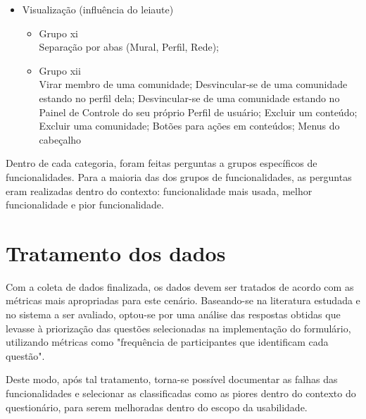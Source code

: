 \begin{itemize}
\item Visualização (influência do leiaute) \\
    \begin{itemize}
    \item Grupo xi\\
    Separação por abas (Mural, Perfil, Rede); 
    \item Grupo xii\\
    Virar membro de uma comunidade; Desvincular-se de uma comunidade estando no perfil dela; Desvincular-se de uma comunidade estando no Painel de Controle do seu próprio Perfil de usuário; Excluir um conteúdo; Excluir uma comunidade; Botões para ações em conteúdos; Menus do cabeçalho
    \end{itemize}

\end{itemize}

	Dentro de cada categoria, foram feitas perguntas a grupos específicos de funcionalidades. Para a maioria das dos grupos de funcionalidades, as perguntas eram realizadas dentro do contexto: funcionalidade mais usada, melhor funcionalidade e pior funcionalidade.



\section{Tratamento dos dados}
\label{sec:trat-dados}
    
    Com a coleta de dados finalizada, os dados devem ser tratados de acordo com as métricas mais apropriadas para este cenário. Baseando-se na literatura estudada e no sistema a ser avaliado, optou-se por uma análise das respostas obtidas que levasse à priorização das questões selecionadas na implementação do formulário, utilizando métricas como "frequência de participantes que identificam cada questão". 
    
    Deste modo, após tal tratamento, torna-se possível documentar as falhas das funcionalidades e selecionar as classificadas como as piores dentro do contexto do questionário, para serem melhoradas dentro do escopo da usabilidade.
